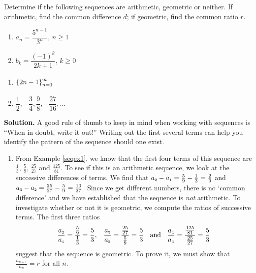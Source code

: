 \begin{ex}  \label{arithgeoex1}  Determine if the following sequences are arithmetic, geometric or neither.  If arithmetic, find the common difference $d$; if geometric, find the common ratio $r$.

\begin{multicols}{2}
\begin{enumerate}


\item  $a_{n} = \dfrac{5^{n-1}}{3^{n}}$, $n \geq 1$

\item  $b_{k} = \dfrac{(-1)^{k}}{2k+1}$, $k \geq 0$

\setcounter{HW}{\value{enumi}}
\end{enumerate}
\end{multicols}

\begin{multicols}{2}
\begin{enumerate}
\setcounter{enumi}{\value{HW}}


\item  $\left\{ 2n - 1 \right\}_{n=1}^{\infty} \vphantom{\dfrac{1}{2}, -\dfrac{3}{4}, \dfrac{9}{8}, -\dfrac{27}{16}, \ldots}$

\item  $\dfrac{1}{2}, -\dfrac{3}{4}, \dfrac{9}{8}, -\dfrac{27}{16}, \ldots$

\setcounter{HW}{\value{enumi}}
\end{enumerate}
\end{multicols}

{\bf Solution.}  A good rule of thumb to keep in mind when working with sequences is ``When in doubt, write it out!''  Writing out the first several terms can help you identify the pattern of the sequence should one exist.

\begin{enumerate}

\item  From Example \ref{seqex1}, we know that the first four terms of this sequence are $\frac{1}{3}, \, \frac{5}{9}, \, \frac{25}{27}$ and $\frac{125}{81}$.  To see if this is an arithmetic sequence, we look at the successive differences of terms.  We find that $a_{\mbox{\tiny$2$}} - a_{\mbox{\tiny$1$}} = \frac{5}{9} - \frac{1}{3} = \frac{2}{9}$ and $a_{\mbox{\tiny$3$}} - a_{\mbox{\tiny$2$}} = \frac{25}{27} - \frac{5}{9} = \frac{10}{27}$.  Since we get different numbers, there is no `common difference' and we have established that the sequence is \textit{not} arithmetic.  To investigate whether or not it is geometric, we compute the ratios of successive terms.  The first three ratios   \[\frac{a_{\mbox{\tiny$2$}}}{a_{\mbox{\tiny$1$}}} = \frac{\frac{5}{9}}{\frac{1}{3}} = \frac{5}{3}, \;\;\; \frac{a_{\mbox{\tiny$3$}}}{a_{\mbox{\tiny$2$}}} = \frac{\frac{25}{27}}{\frac{5}{9}} = \frac{5}{3} \;\; \mbox{ and } \;\; \frac{a_{\mbox{\tiny$4$}}}{a_{\mbox{\tiny$3$}}} = \frac{\frac{125}{81}}{\frac{25}{27}} = \frac{5}{3}\] suggest that the sequence is geometric.  To prove it, we must show that $\frac{a_{n+1}}{a_{n}} = r$ for all $n$.


\end{enumerate}
\end{ex}
